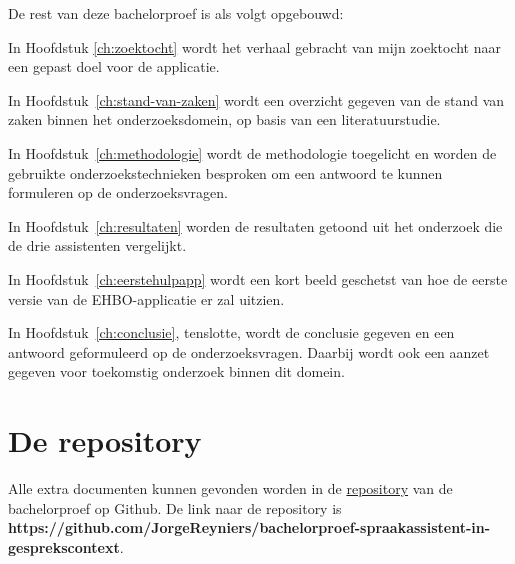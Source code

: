 De rest van deze bachelorproef is als volgt opgebouwd:

In Hoofdstuk \ref{ch:zoektocht} wordt het verhaal gebracht van mijn zoektocht naar een gepast doel voor de applicatie.

In Hoofdstuk~\ref{ch:stand-van-zaken} wordt een overzicht gegeven van de stand van zaken binnen het onderzoeksdomein, op basis van een literatuurstudie.

In Hoofdstuk~\ref{ch:methodologie} wordt de methodologie toegelicht en worden de gebruikte onderzoekstechnieken besproken om een antwoord te kunnen formuleren op de onderzoeksvragen.

In Hoofdstuk~\ref{ch:resultaten} worden de resultaten getoond uit het onderzoek die de drie assistenten vergelijkt.

In Hoofdstuk~\ref{ch:eerstehulpapp} wordt een kort beeld geschetst van hoe de eerste versie van de EHBO-applicatie er zal uitzien.

In Hoofdstuk~\ref{ch:conclusie}, tenslotte, wordt de conclusie gegeven en een antwoord geformuleerd op de onderzoeksvragen. Daarbij wordt ook een aanzet gegeven voor toekomstig onderzoek binnen dit domein.

\section{De repository}
\label{s:verwijzing naar repository}
Alle extra documenten kunnen gevonden worden in de \href{https://github.com/JorgeReyniers/bachelorproef-spraakassistent-in-gesprekscontext}{repository} van de bachelorproef op Github.
De link naar de repository is \textbf{https://github.com/JorgeReyniers/bachelorproef-spraakassistent-in-gesprekscontext}.
